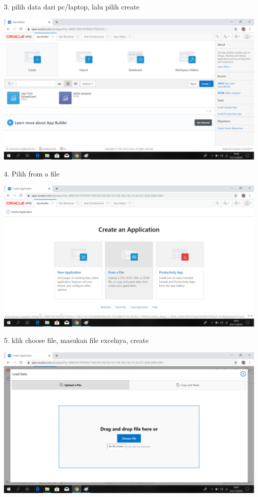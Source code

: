 \documentclass{article}
\begin{document}
\item 3. pilih data dari pc/laptop, lalu pilih create
\begin{center}
    \includegraphics[width=15cm\textwidth]{figure/3Create.png}\\
\end{center}

\item 4. Pilih from a file 
\begin{center}
    \includegraphics[width=15cm\textwidth]{figure/4from.png}\\
\end{center}

\item 5. klik choose file, masukan file excelnya, create 
\begin{center}
    \includegraphics[width=15cm\textwidth]{figure/5choose.png}
\end{center}
\end{document}
